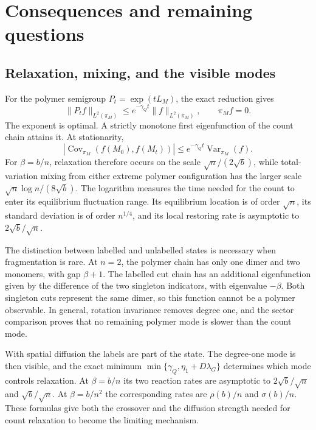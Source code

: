\section{Consequences and remaining questions}\label{sec:discussion}

\subsection{Relaxation, mixing, and the visible modes}

For the polymer semigroup $P_t=\exp(tL_M)$, the exact reduction gives
\begin{equation}\label{eq:L2-decay}
 \|P_tf\|_{L^2(\pi_M)}\le e^{-\gamma_Qt}\|f\|_{L^2(\pi_M)},
 \qquad \pi_Mf=0.
\end{equation}
The exponent is optimal. A strictly monotone first eigenfunction
of the count chain attains it. At stationarity,
\begin{equation}\label{eq:cov-decay}
 \left|\operatorname{Cov}_{\pi_M}(f(M_0),f(M_t))\right|
 \le e^{-\gamma_Qt}\operatorname{Var}_{\pi_M}(f).
\end{equation}
For $\beta=b/n$, relaxation therefore occurs on the scale
$\sqrt n/(2\sqrt b)$, while total-variation mixing from either
extreme polymer configuration has the larger scale
$\sqrt n\log n/(8\sqrt b)$. The logarithm measures the time needed
for the count to enter its equilibrium fluctuation range.
Its equilibrium location is of order $\sqrt n$, its standard
deviation is of order $n^{1/4}$, and its local restoring rate is
asymptotic to $2\sqrt b/\sqrt n$.

The distinction between labelled and unlabelled states is necessary
when fragmentation is rare. At $n=2$, the polymer chain has only
one dimer and two monomers, with gap $\beta+1$. The labelled cut
chain has an additional eigenfunction given by the difference of
the two singleton indicators, with eigenvalue $-\beta$.
Both singleton cuts represent the same dimer, so this function
cannot be a polymer observable. In general, rotation invariance
removes degree one, and the sector comparison proves that no
remaining polymer mode is slower than the count mode.

With spatial diffusion the labels are part of the state. The
degree-one mode is then visible, and the exact minimum
$\min\{\gamma_Q,\eta_1+D\lambda_G\}$ determines which mode controls
relaxation. At $\beta=b/n$ its two reaction rates are asymptotic to
$2\sqrt b/\sqrt n$ and $\sqrt b/\sqrt n$. At
$\beta=b/n^2$ the corresponding rates are $\rho(b)/n$ and
$\sigma(b)/n$. These formulas give both the crossover and the
diffusion strength needed for count relaxation to become the
limiting mechanism.

